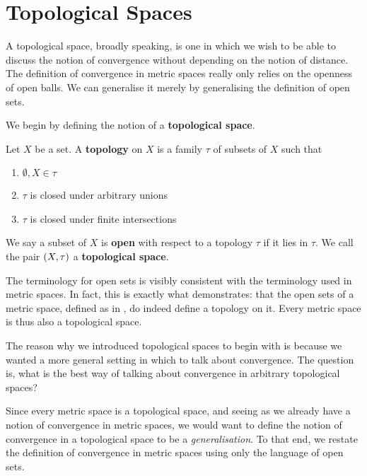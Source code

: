 \section{Topological Spaces}

A topological space, broadly speaking, is one in which we wish to be able to discuss the notion of convergence without depending on the notion of distance. The definition of convergence in metric spaces really only relies on the openness of open balls. We can generalise it merely by generalising the definition of open sets.

We begin by defining the notion of a \textbf{topological space}.

\begin{boxdefinition}
    Let $X$ be a set. A \textbf{topology} on $X$ is a family $\tau$ of subsets of $X$ such that
    \begin{enumerate}
        \item $\emptyset, X \in \tau$
        \item $\tau$ is closed under arbitrary unions
        \item $\tau$ is closed under finite intersections
    \end{enumerate}
    We say a subset of $X$ is \textbf{open} with respect to a topology $\tau$ if it lies in $\tau$. We call the pair $\left( X, \tau \right)$ a \textbf{topological space}.
\end{boxdefinition}

The terminology for open sets is visibly consistent with the terminology used in metric spaces. In fact, this is exactly what  demonstrates: that the open sets of a metric space, defined as in , do indeed define a topology on it. Every metric space is thus also a topological space.

The reason why we introduced topological spaces to begin with is because we wanted a more general setting in which to talk about convergence. The question is, what is the best way of talking about convergence in arbitrary topological spaces?

Since every metric space is a topological space, and seeing as we already have a notion of convergence in metric spaces, we would want to define the notion of convergence in a topological space to be a \textit{generalisation}. To that end, we restate the definition of convergence in metric spaces using only the language of open sets.

